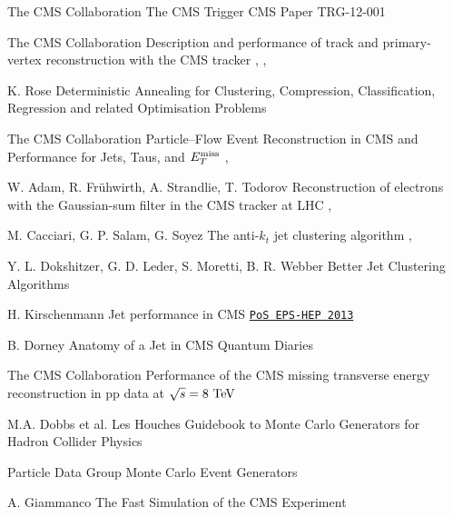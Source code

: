 {The CMS Collaboration}
{The CMS Trigger}
{CMS Paper TRG-12-001}

{The CMS Collaboration}
{Description and performance of track and primary-vertex reconstruction with the CMS tracker}
{, , }

{K. Rose}
{Deterministic Annealing for Clustering, Compression, Classification, Regression and related Optimisation Problems}
{}

{The CMS Collaboration}
{Particle–Flow Event Reconstruction in CMS and Performance for Jets, Taus, and $E_T^\text{miss}$}
{, }

{W. Adam, R. Frühwirth, A. Strandlie, T. Todorov}
{Reconstruction of electrons with the Gaussian-sum filter in the CMS tracker at LHC}
{, }

{M. Cacciari, G. P. Salam, G. Soyez}
{The anti-$k_t$ jet clustering algorithm}
{, }

{Y. L. Dokshitzer, G. D. Leder, S. Moretti, B. R. Webber}
{Better Jet Clustering Algorithms}
{ }

{H. Kirschenmann}
{Jet performance in CMS}
{\texttt{\href{http://pos.sissa.it/archive/conferences/180/433/EPS-HEP\%202013_433.pdf}{PoS EPS-HEP 2013}}}

{B. Dorney}
{Anatomy of a Jet in CMS}
{Quantum Diaries}

{The CMS Collaboration}
{Performance of the CMS missing transverse energy reconstruction in pp data at $\sqrt{s} = 8~\text{TeV}$}
{ }

{M.A. Dobbs et al.}
{Les Houches Guidebook to Monte Carlo Generators for Hadron Collider Physics}
{}

{Particle Data Group}
{Monte Carlo Event Generators}
{}

{A. Giammanco}
{The Fast Simulation of the CMS Experiment}
{}

